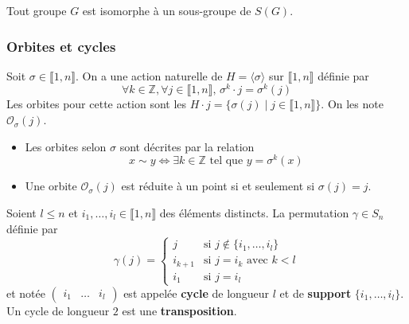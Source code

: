 
  \begin{theorem}
    Tout groupe $G$ est isomorphe à un sous-groupe de $S(G)$.
  \end{theorem}

  \subsubsection{Orbites et cycles}


  \begin{definition}
    Soit $\sigma \in \llbracket 1, n \rrbracket$. On a une action naturelle de $H = \langle \sigma \rangle$ sur $\llbracket 1, n \rrbracket$ définie par
    \[ \forall k \in \mathbb{Z}, \forall j \in \llbracket 1, n \rrbracket, \, \sigma^k \cdot j = \sigma^k(j) \]
    Les orbites pour cette action sont les $H \cdot j = \{ \sigma(j) \mid j \in \llbracket 1, n \rrbracket \}$. On les note $\mathcal{O}_\sigma(j)$.
  \end{definition}

  \begin{remark}
    \begin{itemize}
      \item Les orbites selon $\sigma$ sont décrites par la relation
      \[ x \sim y \iff \exists k \in \mathbb{Z} \text{ tel que } y = \sigma^k(x) \]
      \item Une orbite $\mathcal{O}_\sigma(j)$ est réduite à un point si et seulement si $\sigma(j) = j$.
    \end{itemize}
  \end{remark}


  \begin{definition}
    Soient $l \leq n$ et $i_1, \dots, i_l \in \llbracket 1, n \rrbracket$ des éléments distincts. La permutation $\gamma \in S_n$ définie par
    \[
    \gamma(j) =
    \begin{cases}
      j &\text{si } j \notin \{ i_1, \dots, i_l \} \\
      i_{k+1} &\text{si } j = i_k \text{ avec } k<l \\
      i_1 &\text{si } j=i_l
    \end{cases}
    \]
    et notée $\begin{pmatrix} i_1 & \dots & i_l \end{pmatrix}$ est appelée \textbf{cycle} de longueur $l$ et de \textbf{support} $\{ i_1, \dots, i_l \}$. Un cycle de longueur $2$ est une \textbf{transposition}.
  \end{definition}

